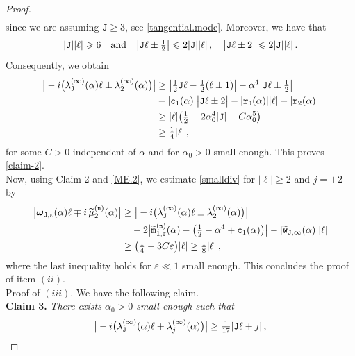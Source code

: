 \documentclass[10pt,a4paper]{amsart}
\newcommand{\bomega}{{\boldsymbol{\omega}}}
\newcommand{\im}{{\rm i}}
\newcommand{\tJ}{{\mathtt J}}
\newcommand{\tc}{{\mathtt c}}
\newcommand{\tm}{{\mathtt m}}
\newcommand{\tn}{{\mathtt n}}
\newcommand{\tr}{{\mathtt r}}
\newcommand{\tw}{{\mathtt w}}
\newcommand{\wt}[1]{{\widetilde{#1}}}
\begin{document}
\begin{proof}
\begin{align}
  	\end{align}
  	since we are assuming $\tJ \geq 3$, see \eqref{tangential.mode}. Moreover, we have that
  	\begin{equation}
  	|\tJ||\ell|\geqslant6\quad\hbox{and}\quad	\big|  \tJ \ell \pm \tfrac12  \big| \leqslant 2|\tJ| |\ell| \,, \quad \big|  \tJ \ell \pm 2 \big| \leqslant 2|\tJ| |\ell| \,.
  	\end{equation}
  	Consequently, we obtain
  	\begin{align}
  		\big|  	-\im\big(  \lambda_{\tJ}^{(\infty)}(\alpha) \ell  \pm \lambda_{2}^{(\infty)} (\alpha) \big)   \big| &\geq  \big|   \tfrac12 \tJ \ell - \tfrac12 (\ell\pm 1)  \big|  - \alpha^4 	\big|  \tJ \ell \pm \tfrac12  \big| \\& - |\tc_{1}(\alpha)| \big| \tJ\ell \pm 2 \big| - |\tr_{\tJ}(\alpha)| |\ell| - |\tr_{2}(\alpha)| \\
  		& \geq  |\ell| \big( \tfrac12 - 2 \alpha_{0}^4  |\tJ|  -C \alpha_{0}^5   \big) \\
  		& \geq \tfrac14 |\ell| \,,
  	\end{align}
  	for some $C>0$ independent of $\alpha$ and for $\alpha_{0}>0$ small enough. This proves \eqref{claim-2}.
    \\[1mm]
   Now, using Claim 2 and  \eqref{ME.2}, we estimate \eqref{smalldiv} for $|\ell| \geq 2$ and $j= \pm 2$ by
   	 \begin{align}
   		\big| \bomega_{\tJ,\varepsilon}(\alpha)  \ell \mp \im\,\wt\mu_{2}^{(\tn)}(\alpha) \big| &  \geq \big| -\im \big( \lambda_{\tJ}^{(\infty)}(\alpha)  \ell \pm \lambda_{2}^{(\infty)}(\alpha) \big) \big| \\
   		& \quad- 2 \big| \wt\tm_{1,\varepsilon}^{(\tn)}(\alpha) - \big( \tfrac12 -\alpha^4 + \tc_{1}(\alpha) \big)  \big|  - |\wt\tw_{\tJ,\infty}(\alpha)| |\ell|  \\
   		& \geq \big( \tfrac14 - 3C\varepsilon   \big)|\ell| \geq \tfrac18 |\ell| \,,
   	\end{align}
   	where the last inequality holds for $\varepsilon \ll 1$ small enough. This concludes the proof of item $(ii)$.
   	\\[1mm]
   	{\sc Proof of $(iii)$}. We have the following claim.
   	\\[1mm]
   	{\bf Claim 3.} {\it There exists $\alpha_{0}>0$ small enough such that}
   	\begin{equation}\label{claim-3}
   			\big|  	-\im\big(  \lambda_{\tJ}^{(\infty)}(\alpha) \ell  + \lambda_{j}^{(\infty)} (\alpha) \big)   \big| \geq  \tfrac{1}{17} |\tJ\ell+j|\,,

\end{equation}
\end{proof}
\end{document}
